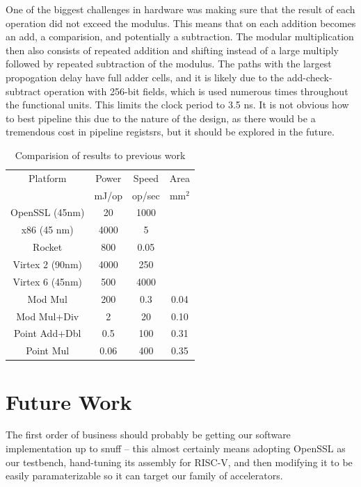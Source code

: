 \documentclass[twocolumn]{article}
\begin{document}
One of the biggest challenges in hardware was making sure that the
result of each operation did not exceed the modulus. This means that
on each addition becomes an add, a comparision, and potentially a
subtraction. The modular multiplication then also consists of repeated
addition and shifting instead of a large multiply followed by repeated
subtraction of the modulus. The paths with the largest propogation
delay have full adder cells, and it is likely due to the
add-check-subtract operation with 256-bit fields, which is used
numerous times throughout the functional units. This limits the clock
period to 3.5 ns. It is not obvious how to best pipeline this due to
the nature of the design, as there would be a tremendous cost in
pipeline registsrs, but it should be explored in the future.

\begin{table}[ht]
  \begin{center}
    \begin{tabular}{c|ccc}
      Platform        & Power & Speed  & Area \\
                      & mJ/op & op/sec & mm$^2$ \\
      \hline
      OpenSSL (45nm)  & 20    & 1000   &      \\
      x86 (45 nm)     & 4000  & 5      &      \\
      Rocket          & 800   & 0.05   &      \\
      Virtex 2 (90nm) & 4000  & 250    &      \\
      Virtex 6 (45nm) & 500   & 4000   &      \\
      \hline
      Mod Mul         & 200   & 0.3    & 0.04 \\
      Mod Mul+Div     & 2     & 20     & 0.10 \\
      Point Add+Dbl   & 0.5   & 100    & 0.31 \\
      Point Mul       & 0.06  & 400    & 0.35 \\
    \end{tabular}
  \end{center}

  \caption{Comparision of results to previous work
    \label{results}}
\end{table}

\section{Future Work}

The first order of business should probably be getting our software
implementation up to snuff -- this almost certainly means adopting
OpenSSL as our testbench, hand-tuning its assembly for RISC-V, and
then modifying it to be easily paramaterizable so it can target our
family of accelerators.
\end{document}
